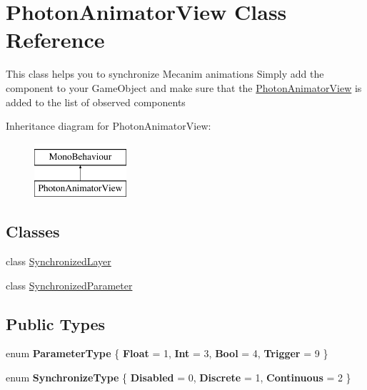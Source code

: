\hypertarget{class_photon_animator_view}{}\section{Photon\+Animator\+View Class Reference}
\label{class_photon_animator_view}


This class helps you to synchronize Mecanim animations Simply add the component to your Game\+Object and make sure that the \hyperlink{class_photon_animator_view}{Photon\+Animator\+View} is added to the list of observed components  


Inheritance diagram for Photon\+Animator\+View\+:\begin{figure}[H]
\begin{center}
\leavevmode
\includegraphics[height=2.000000cm]{class_photon_animator_view}
\end{center}
\end{figure}
\subsection*{Classes}
\begin{DoxyCompactItemize}
\item 
class \hyperlink{class_photon_animator_view_1_1_synchronized_layer}{Synchronized\+Layer}
\item 
class \hyperlink{class_photon_animator_view_1_1_synchronized_parameter}{Synchronized\+Parameter}
\end{DoxyCompactItemize}
\subsection*{Public Types}
\begin{DoxyCompactItemize}
\item 
enum {\bfseries Parameter\+Type} \{ {\bfseries Float} = 1, 
{\bfseries Int} = 3, 
{\bfseries Bool} = 4, 
{\bfseries Trigger} = 9
 \}\hypertarget{class_photon_animator_view_aa41dc91e8da385b9f10cf9bf5dc47894}{}\label{class_photon_animator_view_aa41dc91e8da385b9f10cf9bf5dc47894}

\item 
enum {\bfseries Synchronize\+Type} \{ {\bfseries Disabled} = 0, 
{\bfseries Discrete} = 1, 
{\bfseries Continuous} = 2
 \}\hypertarget{class_photon_animator_view_ae3ad07de936a811cbb923adffe1f167f}{}\label{class_photon_animator_view_ae3ad07de936a811cbb923adffe1f167f}

\end{DoxyCompactItemize}
